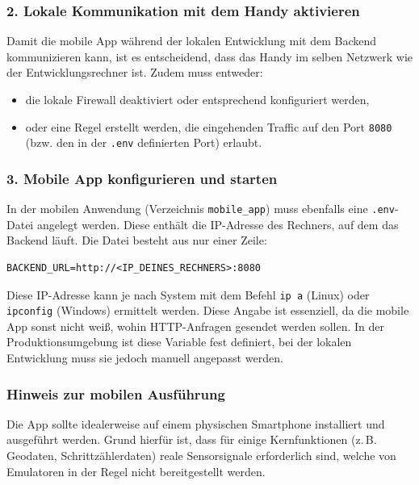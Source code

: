 \documentclass[11pt,a4paper]{article}
\begin{document}
\subsubsection{2. Lokale Kommunikation mit dem Handy aktivieren}

Damit die mobile App während der lokalen Entwicklung mit dem Backend kommunizieren kann, ist es entscheidend, dass das Handy im selben Netzwerk wie der Entwicklungsrechner ist. Zudem muss entweder:

\begin{itemize}
    \item die lokale Firewall deaktiviert oder entsprechend konfiguriert werden,
    \item oder eine Regel erstellt werden, die eingehenden Traffic auf den Port \texttt{8080} (bzw. den in der \texttt{.env} definierten Port) erlaubt.
\end{itemize}

\subsubsection{3. Mobile App konfigurieren und starten}

In der mobilen Anwendung (Verzeichnis \texttt{mobile\_app}) muss ebenfalls eine \texttt{.env}-Datei angelegt werden. Diese enthält die IP-Adresse des Rechners, auf dem das Backend läuft. Die Datei besteht aus nur einer Zeile:

\begin{verbatim}
BACKEND_URL=http://<IP_DEINES_RECHNERS>:8080
\end{verbatim}

Diese IP-Adresse kann je nach System mit dem Befehl \texttt{ip a} (Linux) oder \texttt{ipconfig} (Windows) ermittelt werden. Diese Angabe ist essenziell, da die mobile App sonst nicht weiß, wohin HTTP-Anfragen gesendet werden sollen. In der Produktionsumgebung ist diese Variable fest definiert, bei der lokalen Entwicklung muss sie jedoch manuell angepasst werden.

\subsubsection*{Hinweis zur mobilen Ausführung}

Die App sollte idealerweise auf einem physischen Smartphone installiert und ausgeführt werden. Grund hierfür ist, dass für einige Kernfunktionen (z.\,B. Geodaten, Schrittzählerdaten) reale Sensorsignale erforderlich sind, welche von Emulatoren in der Regel nicht bereitgestellt werden.
\end{document}
